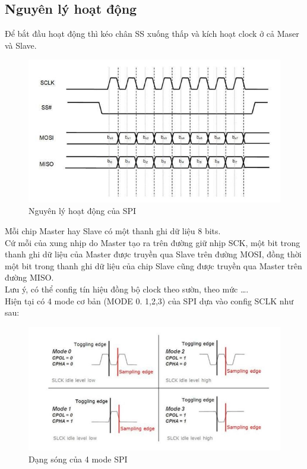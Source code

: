 \subsection{Nguyên lý hoạt động}
Để bắt đầu hoạt động thì kéo chân SS xuống thấp và kích hoạt clock ở cả Maser và Slave.
\begin{center}
\begin{figure}[htp]
\begin{center}
\includegraphics[scale=1]{image5/nguyenly1.jpg}
\end{center}
\caption{Nguyên lý hoạt động của SPI}
\end{figure}
\end{center}
Mỗi chip Master hay Slave có một thanh ghi dữ liệu 8 bits.\\
Cứ mỗi của xung nhịp do Master tạo ra trên đường giữ nhịp SCK, một bit trong thanh ghi dữ liệu của Master được truyền qua Slave trên đường MOSI, đồng thời một bit trong thanh ghi dữ liệu của chip Slave cũng được truyền qua Master trên đường MISO.\\
Lưu ý, có thể config tín hiệu đồng bộ clock theo sườn, theo mức ….\\
Hiện tại có 4 mode cơ bản (MODE 0. 1,2,3) của SPI dựa vào config SCLK như sau:\\
\begin{center}
\begin{figure}[htp]
\begin{center}
\includegraphics[scale=1]{image5/nguyenly2.jpg}
\end{center}
\caption{Dạng sóng của 4 mode SPI}
\end{figure}
\end{center}
